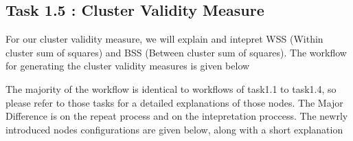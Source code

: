 \documentclass[11pt]{article}
\begin{document}
		\subsection*{Task 1.5 : Cluster Validity Measure}
			For our cluster validity measure, we will explain and intepret WSS (Within cluster sum of squares) and BSS (Between cluster sum of squares). The workflow for generating the cluster validity measures is given below

			The majority of the workflow is identical to workflows of task1.1 to task1.4, so please refer to those tasks for a detailed explanations of those nodes. The Major Difference is on the repeat process and on the intepretation proccess. The newrly introduced nodes configurations are given below, along with a short explanation
			\iffalse
\end{document}
